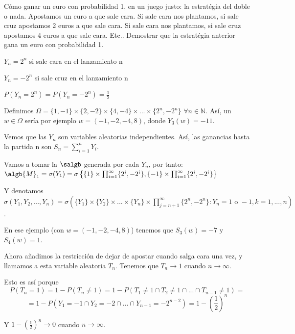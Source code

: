 \begin{problem}[6] C\'omo ganar un euro con probabilidad 1, en un juego justo: la estrat\'egia del doble o nada.
Apostamos un euro a que sale cara. Si sale cara nos plantamos, si sale cruz apostamos
2 euros a que sale cara. Si sale cara nos plantamos, si sale cruz apostamos
4 euros a que sale cara. Etc.. Demostrar que la  estrat\'egia anterior gana un euro
 con probabilidad 1.
\solution

\begin{expla}

\end{expla}
$Y_n = 2^n$ si sale cara en el lanzamiento n

$Y_n=-2^n$ si sale cruz en el lanzamiento n

$P(Y_n=2^n)=P(Y_n=-2^n)=\frac{1}{2}$

Definimos $\Omega = \{1,-1\}\times\{2,-2\}\times\{4,-4\}\times...\times\{2^n,-2^n\}$ $\forall n\in \mathbb{N}$. Así, un $w \in \Omega$ sería por ejemplo $w=(-1,-2,-4,8)$, donde $Y_3(w)=-11$.

Vemos que las $Y_n$ son variables aleatorias independientes. Así, las ganancias hasta la partida n son $S_n=\sum_{i=1}^{n}Y_i$.

Vamos a tomar la $\salgb$ generada por cada $Y_n$, por tanto: $\algb{M}_1 = \sigma(Y_1)=\sigma\left\{\{1\}\times\prod_{i=1}^{\infty}\{2^i,-2^i\},\{-1\}\times\prod_{i=1}^{\infty}\{2^i,-2^i\} \right\}$

Y denotamos $\sigma(Y_1, Y_2,...,Y_n)=\sigma(\{Y_1\}\times\{Y_2\}\times ... \times\{Y_n\}\times \prod_{j=n+1}^{\infty}\{2^{n},-2^{n}\} : Y_n= 1 \text{ o } -1, k=1,...,n )$.

En ese ejemplo (con $w=(-1,-2,-4,8)$) tenemos que $S_3(w)=-7$ y $S_4(w)=1$.


Ahora añadimos la restricción de dejar de apostar cuando salga cara una vez, y llamamos a esta variable aleatoria $T_n$. Tenemos que $T_n \rightarrow 1$ cuando $n \rightarrow \infty$. 

Esto es así porque $$P(T_n=1) = 1-P(T_n\neq 1) = 1 - P(T_1\neq1 \cap T_2\neq1 \cap ... \cap T_{n-1}\neq1) =$$ $$= 1 - P(Y_1=-1 \cap Y_2=-2 \cap ... \cap Y_{n-1}=-2^{n-2}) = 1-\left(\frac{1}{2}\right)^n$$

Y  $1-\left(\frac{1}{2}\right)^n \rightarrow 0$ cuando $n \rightarrow \infty$.

\end{problem}

